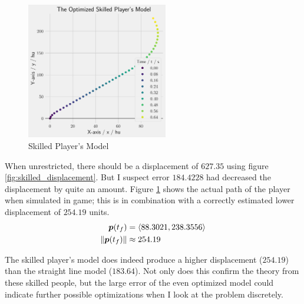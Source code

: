 \begin{figure}[H]
    \centering
    \includegraphics[width=0.55\textwidth]{assets/skilled_player.png}
    \caption{Skilled Player's Model}
    \label{fig:skilled_player}
\end{figure}


When unrestricted, there should be a displacement of $627.35$ using figure \ref{fig:skilled_displacement}. But I suspect error $184.4228$ had decreased the displacement by quite an amount. Figure \ref{fig:skilled_player} shows the actual path of the player when simulated in game; this is in combination with a correctly estimated lower displacement of $254.19$ units.
\begin{align*}
    \boldsymbol{p}(t_f) &= \left\langle 88.3021, 238.3556 \right\rangle\\
    \|\boldsymbol{p}(t_f)\| &\approx 254.19
\end{align*}

The skilled player's model does indeed produce a higher displacement ($254.19$) than the straight line model ($183.64$). Not only does this confirm the theory from these skilled people, but the large error of the even optimized model could indicate further possible optimizations when I look at the problem discretely.
